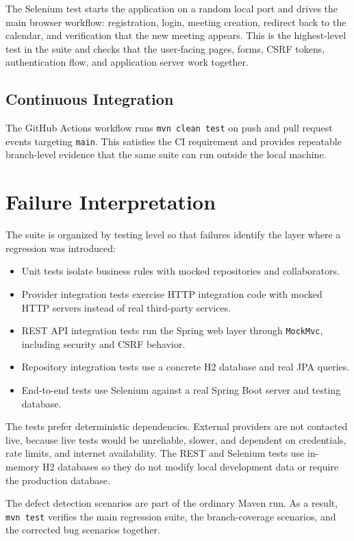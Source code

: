 The Selenium test starts the application on a random local port and drives the main browser workflow: registration, login, meeting creation, redirect back to the calendar, and verification that the new meeting appears. This is the highest-level test in the suite and checks that the user-facing pages, forms, CSRF tokens, authentication flow, and application server work together.

\subsection{Continuous Integration}

The GitHub Actions workflow runs \texttt{mvn clean test} on push and pull request events targeting \texttt{main}. This satisfies the CI requirement and provides repeatable branch-level evidence that the same suite can run outside the local machine.

\section{Failure Interpretation}

The suite is organized by testing level so that failures identify the layer where a regression was introduced:

\begin{itemize}
\item Unit tests isolate business rules with mocked repositories and collaborators.
\item Provider integration tests exercise HTTP integration code with mocked HTTP servers instead of real third-party services.
\item REST API integration tests run the Spring web layer through \texttt{MockMvc}, including security and CSRF behavior.
\item Repository integration tests use a concrete H2 database and real JPA queries.
\item End-to-end tests use Selenium against a real Spring Boot server and testing database.
\end{itemize}

The tests prefer deterministic dependencies. External providers are not contacted live, because live tests would be unreliable, slower, and dependent on credentials, rate limits, and internet availability. The REST and Selenium tests use in-memory H2 databases so they do not modify local development data or require the production database.

The defect detection scenarios are part of the ordinary Maven run. As a result, \texttt{mvn test} verifies the main regression suite, the branch-coverage scenarios, and the corrected bug scenarios together.
